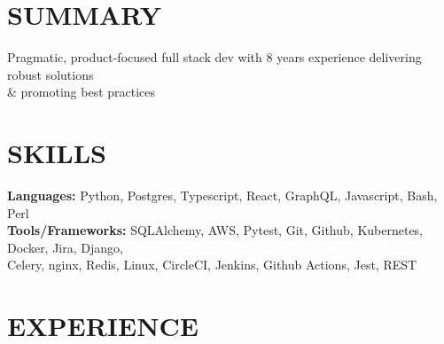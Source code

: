 \documentclass[]{resume}
\begin{document}
\begin{resume}
\setlength{\sectionskip}{1.30em}
\section{SUMMARY\makebox[387 px]{\rule[.5 ex]{387 px}{1.0pt}}}
Pragmatic, product-focused full stack dev with 8 years experience delivering robust solutions \\
\& promoting best practices
\section{SKILLS\makebox[416 px]{\rule[.5 ex]{416 px}{1.0pt}}}
\vspace{0.9mm}
\textbf{Languages:} \hspace*{11.5mm}
Python, Postgres, Typescript, React, GraphQL, Javascript, Bash, Perl
 {\fontsize{0.1}{0.1}\selectfont {}}\\
% 
\textbf{Tools/Frameworks:} SQLAlchemy, AWS, Pytest, Git, Github, Kubernetes, Docker, Jira, Django, \\
\hspace*{32mm}Celery, nginx, Redis, Linux, CircleCI, Jenkins, Github Actions, Jest, REST
 {\fontsize{0.1}{0.1}\selectfont {}}

\section{EXPERIENCE\makebox[372 px]{\rule[.5 ex]{372 px}{1.0pt}}}


\end{resume}
\end{document}
